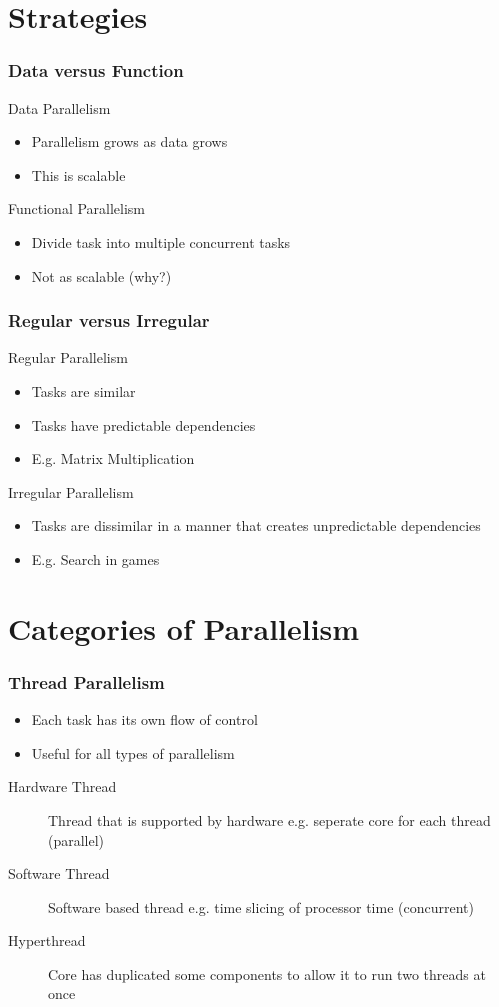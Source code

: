 \documentclass{beamer}
\begin{document}
\section{Strategies}
\begin{frame}
	\frametitle{Data versus Function}
Data Parallelism
\begin{itemize}
	\item Parallelism grows as data grows
	\item This is scalable
\end{itemize}

Functional Parallelism	
\begin{itemize}
	\item Divide task into multiple concurrent tasks
	\item Not as scalable (why?)
\end{itemize}
	
\end{frame}
\begin{frame}
	\frametitle{Regular versus Irregular}
Regular Parallelism
\begin{itemize}
	\item Tasks are similar
	\item Tasks have predictable dependencies
	\item E.g. Matrix Multiplication
\end{itemize}

Irregular Parallelism	
\begin{itemize}
	\item Tasks are dissimilar in a manner that creates unpredictable dependencies
	\item E.g. Search in games
\end{itemize}
	
\end{frame}



\section{Categories of Parallelism}
\begin{frame}
	\frametitle{Thread Parallelism}
	\begin{itemize}
	\item Each task has its own flow of control
	\item Useful for all types of parallelism
	\end{itemize}
\begin{description}
\item[Hardware Thread]
Thread that is supported by hardware e.g. seperate core for each thread (parallel)
\item[Software Thread] Software based thread e.g. time slicing of processor time (concurrent)
\item[Hyperthread]
Core has duplicated some components to allow it to run two threads at once
\end{description}
\end{frame}
\end{document}

